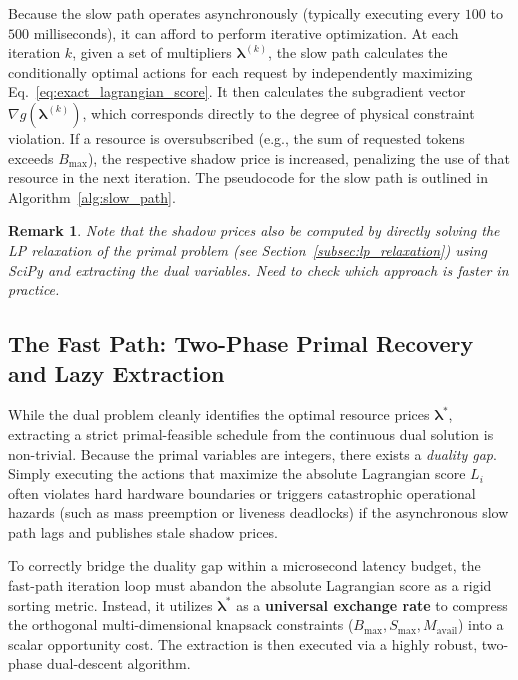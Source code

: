 \documentclass[11pt]{article}
\newtheorem{remark}{Remark}
\begin{document}
Because the slow path operates asynchronously (typically executing every $100$ to $500$ milliseconds), it can afford to perform iterative optimization. At each iteration $k$, given a set of multipliers $\boldsymbol{\lambda}^{(k)}$, the slow path calculates the conditionally optimal actions for each request by independently maximizing Eq.~\ref{eq:exact_lagrangian_score}. It then calculates the subgradient vector $\nabla g(\boldsymbol{\lambda}^{(k)})$, which corresponds directly to the degree of physical constraint violation. If a resource is oversubscribed (e.g., the sum of requested tokens exceeds $B_{\max}$), the respective shadow price is increased, penalizing the use of that resource in the next iteration. The pseudocode for the slow path is outlined in Algorithm~\ref{alg:slow_path}.

\begin{remark}
    Note that the shadow prices also be computed by directly solving the LP relaxation of the primal problem (see Section~\ref{subsec:lp_relaxation}) using SciPy and extracting the dual variables. Need to check which approach is faster in practice.
\end{remark}


\subsection{The Fast Path: Two-Phase Primal Recovery and Lazy Extraction}
\label{subsec:fast_path}

While the dual problem cleanly identifies the optimal resource prices $\boldsymbol{\lambda}^*$, extracting a strict primal-feasible schedule from the continuous dual solution is non-trivial. Because the primal variables are integers, there exists a \textit{duality gap}. Simply executing the actions that maximize the absolute Lagrangian score $L_i$ often violates hard hardware boundaries or triggers catastrophic operational hazards (such as mass preemption or liveness deadlocks) if the asynchronous slow path lags and publishes stale shadow prices.

To correctly bridge the duality gap within a microsecond latency budget, the fast-path iteration loop must abandon the absolute Lagrangian score as a rigid sorting metric. Instead, it utilizes $\boldsymbol{\lambda}^*$ as a \textbf{universal exchange rate} to compress the orthogonal multi-dimensional knapsack constraints ($B_{\max}, S_{\max}, M_{\mathrm{avail}}$) into a scalar opportunity cost. The extraction is then executed via a highly robust, two-phase dual-descent algorithm.
\end{document}
